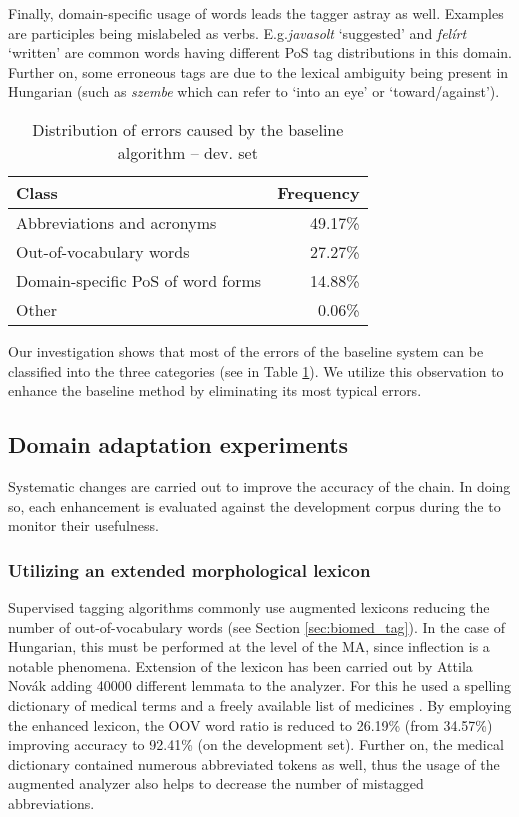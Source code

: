 Finally, domain-specific usage of words leads the tagger astray as well. 
Examples are participles being mislabeled as verbs. 
E.g.\textit{javasolt} `suggested’  and  \textit{felírt} `written’ are common words having different PoS tag distributions in this domain. 
Further on, some erroneous tags are due to the lexical ambiguity being present in Hungarian (such as \textit{szembe} which can refer to `into an eye’ or `toward/against’). 

\begin{table}[h]
\centering
\caption{Distribution of errors caused by the baseline algorithm -- dev. set}
\label{tab:error_types}
\begin{tabular}{ l r } 
\hline
Class & Frequency  \\
\hline
Abbreviations and acronyms & 49.17\% \\
Out-of-vocabulary words & 27.27\% \\
Domain-specific PoS of word forms & 14.88\% \\
Other & 0.06\% \\
\hline
\end{tabular}
\end{table}

Our investigation shows that most of the errors of the baseline system can be classified into the three categories (see in Table \ref{tab:error_types}). 
We utilize this observation to enhance the baseline method by eliminating its most typical errors.

\subsection{Domain adaptation experiments}

Systematic changes are carried out to improve the accuracy of the chain. 
In doing so, each enhancement is evaluated against the development corpus during the to monitor their usefulness.

\subsubsection{Utilizing an extended morphological lexicon}
\label{sec:ma-extension}

Supervised tagging algorithms commonly use augmented lexicons reducing the number of out-of-vocabulary words (see Section \ref{sec:biomed_tag}). 
In the case of Hungarian, this must be performed at the level of the MA, since inflection is a notable phenomena. 
Extension of the lexicon has been carried out by Attila Novák \cite{Orosz2014} adding 40000 different lemmata to the analyzer. 
For this he used a spelling dictionary of medical terms \cite{Fabian1992} and a freely available list of medicines \cite{Foigazgatosag2012}.
By employing the enhanced lexicon, the OOV word ratio is reduced to 26.19\% (from 34.57\%) improving accuracy to 92.41\% (on the development set). 
Further on, the medical dictionary \cite{Fabian1992} contained numerous abbreviated tokens as well, thus the usage of the augmented analyzer also helps to decrease the number of mistagged abbreviations.

